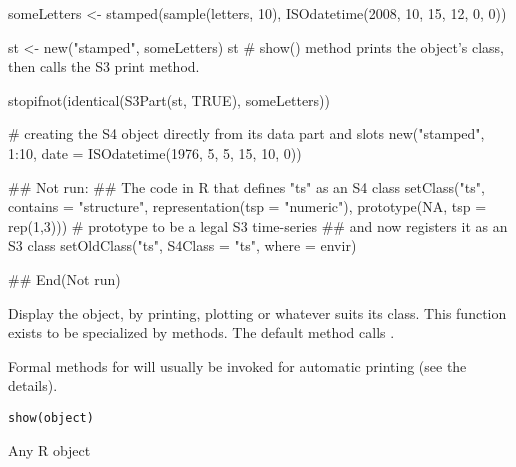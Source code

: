 \begin{Examples}
\begin{ExampleCode}
someLetters <- stamped(sample(letters, 10),  ISOdatetime(2008, 10, 15, 12, 0, 0))

st <- new("stamped", someLetters)  
st  # show() method prints the object's class, then calls the S3 print method.

stopifnot(identical(S3Part(st, TRUE), someLetters))

# creating the S4 object directly from its data part and slots
new("stamped", 1:10, date = ISOdatetime(1976, 5, 5, 15, 10, 0))

## Not run: 
## The code in R that defines "ts" as an S4 class
setClass("ts", contains = "structure", 
      representation(tsp = "numeric"), 
      prototype(NA, tsp = rep(1,3))) # prototype to be a legal S3 time-series
## and now registers it as an S3 class
    setOldClass("ts", S4Class = "ts", where = envir)
 
## End(Not run)



\end{ExampleCode}
\end{Examples}
%
\begin{Description}\relax
Display the object, by printing, plotting or whatever suits its
class.  This function exists to be specialized by methods.  The
default method calls .

Formal methods for  will
usually be invoked for automatic printing (see the details).
\end{Description}
%
\begin{Usage}
\begin{verbatim}
show(object)
\end{verbatim}
\end{Usage}
%
\begin{Arguments}
\begin{ldescription}
\item[\code{object}] Any R object
\end{ldescription}
\end{Arguments}
